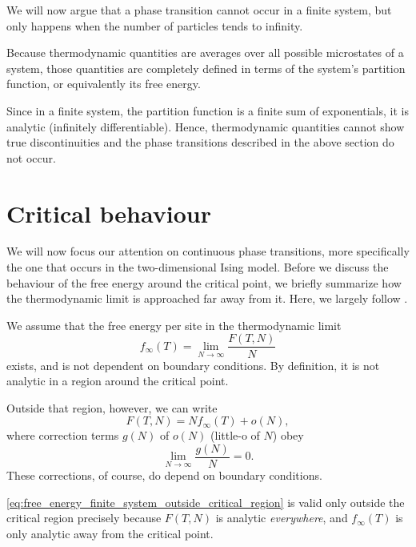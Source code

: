 We will now argue that a phase transition cannot occur in a finite system,
but only happens when the number of particles tends to infinity.

Because thermodynamic quantities are averages over all possible
microstates of a system, those quantities are completely defined in terms
of the system's partition function, or equivalently its free energy.

Since in a finite system, the partition function is a finite sum of
exponentials, it is analytic (infinitely differentiable). Hence, thermodynamic
quantities cannot show true discontinuities and the phase transitions
described in the above section do not occur.


\section{Critical behaviour}
We will now focus our attention on continuous phase transitions, more specifically the one that occurs in the
two-dimensional Ising model.
Before we discuss the behaviour of the free energy around the critical point,
we briefly summarize how the thermodynamic limit is approached far away from it.
Here, we largely follow \cite{barber1983finite}.

We assume that the free energy per site in the thermodynamic limit
\begin{equation}
  f_{\infty}(T) = \lim_{N \to \infty} \frac{F(T, N)}{N}
\end{equation}
exists, and is not dependent on boundary conditions.
By definition, it is not analytic in a region around the critical point.

Outside that region, however, we can write
\begin{equation}\label{eq:free_energy_finite_system_outside_critical_region}
  F(T, N) = N f_{\infty}(T) + o(N),
\end{equation}
where correction terms $g(N)$ of $o(N)$ (little-o of $N$) obey
\begin{equation}
  \lim_{N \to \infty} \frac{g(N)}{N} = 0.
\end{equation}
These corrections, of course, do depend on boundary conditions.

\autoref{eq:free_energy_finite_system_outside_critical_region} is valid only outside the critical region precisely
because $F(T, N)$ is analytic \emph{everywhere}, and $f_{\infty}(T)$ is only analytic away from the critical point.

